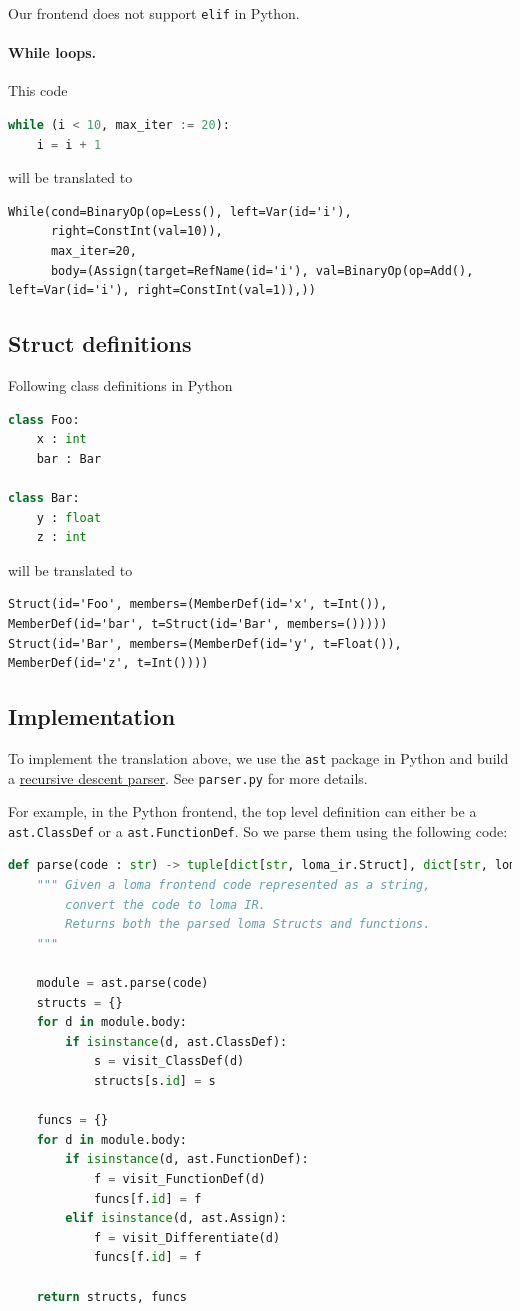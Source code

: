 Our frontend does not support \lstinline{elif} in Python.

\paragraph{While loops.} This code
\begin{lstlisting}[language=python]
while (i < 10, max_iter := 20):
    i = i + 1
\end{lstlisting}
will be translated to
\begin{lstlisting}
While(cond=BinaryOp(op=Less(), left=Var(id='i'),
      right=ConstInt(val=10)),
      max_iter=20,
      body=(Assign(target=RefName(id='i'), val=BinaryOp(op=Add(), left=Var(id='i'), right=ConstInt(val=1)),))
\end{lstlisting}

\subsection{Struct definitions}
Following class definitions in Python
\begin{lstlisting}[language=Python]
class Foo:
    x : int
    bar : Bar

class Bar:
    y : float
    z : int
\end{lstlisting}
will be translated to
\begin{lstlisting}
Struct(id='Foo', members=(MemberDef(id='x', t=Int()), MemberDef(id='bar', t=Struct(id='Bar', members=()))))
Struct(id='Bar', members=(MemberDef(id='y', t=Float()), MemberDef(id='z', t=Int())))
\end{lstlisting}

\subsection{Implementation}

To implement the translation above, we use the \lstinline{ast} package in Python and build a \href{https://en.wikipedia.org/wiki/Recursive_descent_parser}{recursive descent parser}. See \lstinline{parser.py} for more details.

For example, in the Python frontend, the top level definition can either be a \lstinline{ast.ClassDef} or a \lstinline{ast.FunctionDef}. So we parse them using the following code:
\begin{lstlisting}[language=Python]
def parse(code : str) -> tuple[dict[str, loma_ir.Struct], dict[str, loma_ir.func]]:
    """ Given a loma frontend code represented as a string,
        convert the code to loma IR.
        Returns both the parsed loma Structs and functions.
    """

    module = ast.parse(code)
    structs = {}
    for d in module.body:
        if isinstance(d, ast.ClassDef):
            s = visit_ClassDef(d)
            structs[s.id] = s

    funcs = {}
    for d in module.body:
        if isinstance(d, ast.FunctionDef):
            f = visit_FunctionDef(d)
            funcs[f.id] = f
        elif isinstance(d, ast.Assign):
            f = visit_Differentiate(d)
            funcs[f.id] = f

    return structs, funcs
\end{lstlisting}


